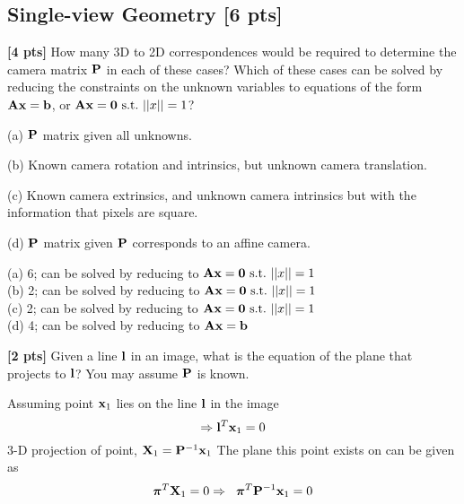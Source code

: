 \documentclass[11pt,addpoints,answers]{exam}
\numberwithin{equation}{section} %
\numberwithin{figure}{section} %
\numberwithin{table}{section} %
\begin{document}
\begin{questions}
\section{Single-view Geometry [6 pts]}
\question \textbf{[4 pts]} How many 3D to 2D correspondences would be required to determine the camera matrix $\mathbf{P}$ in each of these cases? Which of these cases can be solved by reducing the constraints on the unknown variables to equations of the form $\mathbf{A}\mathbf{x}=\mathbf{b}$, or $\mathbf{A}\mathbf{x}=\mathbf{0}~\text{s.t.}~||x||=1$?

(a) $\mathbf{P}$ matrix given all unknowns.

(b) Known camera rotation and intrinsics, but unknown camera translation.

(c) Known camera extrinsics, and unknown camera intrinsics but with the information that pixels are square.

(d) $\mathbf{P}$ matrix given $\mathbf{P}$ corresponds to an affine camera.

\begin{tcolorbox}[fit,height=3cm, width=\textwidth, blank, borderline={0.5pt}{-2pt},halign=left, valign=center, nobeforeafter]

(a) 6; can be solved by reducing to $\mathbf{A}\mathbf{x}=\mathbf{0}~\text{s.t.}~||x||=1$\\
(b) 2; can be solved by reducing to $\mathbf{A}\mathbf{x}=\mathbf{0}~\text{s.t.}~||x||=1$\\
(c) 2; can be solved by reducing to $\mathbf{A}\mathbf{x}=\mathbf{0}~\text{s.t.}~||x||=1$\\
(d) 4; can be solved by reducing to $\mathbf{A}\mathbf{x}=\mathbf{b}$\\
\end{tcolorbox}

\question \textbf{[2 pts]} Given a line $\mathbf{l}$ in an image, what is the equation of the plane that projects to $\mathbf{l}$? You may assume $\mathbf{P}$ is known.

\begin{tcolorbox}[fit,height=5cm, width=\textwidth, blank, borderline={0.5pt}{-2pt},halign=left, valign=center, nobeforeafter]

Assuming point $\mathbf{x}_1$ lies on the line $\mathbf{l}$ in the image 
\begin{equation}\label{eq:line-point}
    \Rightarrow \mathbf{l}^T \mathbf{x}_1 = 0
\end{equation}
3-D projection of point, $\mathbf{X}_1 = \mathbf{P}^{-1} \mathbf{x}_1$
The plane this point exists on can be given as
\begin{equation}\label{plane-point}
    \boldsymbol \pi^T \mathbf{X}_1 = 0 \Rightarrow \hspace{0.2cm} \boldsymbol \pi^T\mathbf{P}^{-1} \mathbf{x}_1 = 0  
\end{equation}


\end{tcolorbox}
\end{questions}
\end{document}
